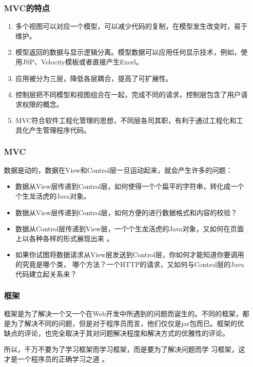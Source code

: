 \begin{frame}[fragile] %
  \frametitle{MVC的特点}\kai
  \begin{enumerate}
  \item 多个视图可以对应一个模型，可以减少代码的复制，在模型发生改变时，易于维护。
  \item 模型返回的数据与显示逻辑分离。模型数据可以应用任何显示技术，例如，使用JSP、Velocity模板或者直接产生Excel。
  \item 应用被分为三层，降低各层耦合，提高了可扩展性。
  \item 控制层把不同模型和视图组合在一起，完成不同的请求，控制层包含了用户请求权限的概念。
  \item MVC符合软件工程化管理的思想，不同层各司其职，有利于通过工程化和工具化产生管理程序代码。
  \end{enumerate}
\end{frame}

\begin{frame}[fragile] %
  \frametitle{MVC}

  数据是动的，数据在View和Control层一旦运动起来，就会产生许多的问题：
  \begin{itemize}[<+-| alert@+>]\kai\small
  \item 数据从View层传递到Control层，如何使得一个个扁平的字符串，转化成一个个生龙活虎的Java对象。
  \item 数据从View层传递到Control层，如何方便的进行数据格式和内容的校验？ 
  \item 数据从Control层传递到View层，一个个生龙活虎的Java对象，又如何在页面上以各种各样的形式展现出来 。
  \item 如果你试图将数据请求从View层发送到Control层，你如何才能知道你要调用的究竟是哪个类，
    哪个方法？一个HTTP的请求，又如何与Control层的Java代码建立起关系来？
  \end{itemize}
\end{frame}

\begin{frame}[fragile] %
\frametitle{框架}

框架是为了解决一个又一个在Web开发中所遇到的问题而诞生的。不同的框架，都
是为了解决不同的问题，但是对于程序员而言，他们仅仅是jar包而已。框架的优
缺点的评论，也完全取决于其对问题解决程度和解决方式的优雅性的评论。

所以，{\hei\Blue 千万不要为了学习框架而学习框架，而是要为了解决问题而学
  习框架，这才是一个程序员的正确学习之道 。}
\end{frame}

